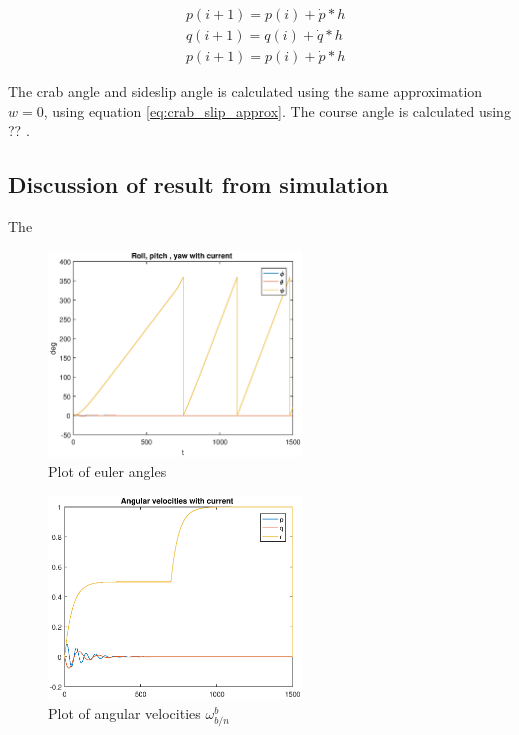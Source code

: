 \begin{equation}
\begin{aligned}
	& p(i+1) = p(i) + \dot{p} * h \\
	& q(i+1) = q(i) + \dot{q} * h \\
	& p(i+1) = p(i) + \dot{p} * h
\end{aligned}
\end{equation}

The crab angle and sideslip angle  is calculated using the same approximation $w = 0$, using equation \eqref{eq:crab_slip_approx}. The course angle is calculated using ?? .


\subsection*{Discussion of result from simulation}

The 

\begin{figure}[!ht]
	\centering
	\includegraphics[width=0.6\textwidth]{figures/2_6_ang.eps}
	\caption{Plot of euler angles}
	\label{fig:2_6_ang}
\end{figure}

\begin{figure}[!ht]
	\centering
	\includegraphics[width=0.6\textwidth]{figures/2_6_ang_vel.eps}
	\caption{Plot of angular velocities $\omega^b_{b/n}$}
	\label{fig:2_6_ang_vel}
\end{figure}

